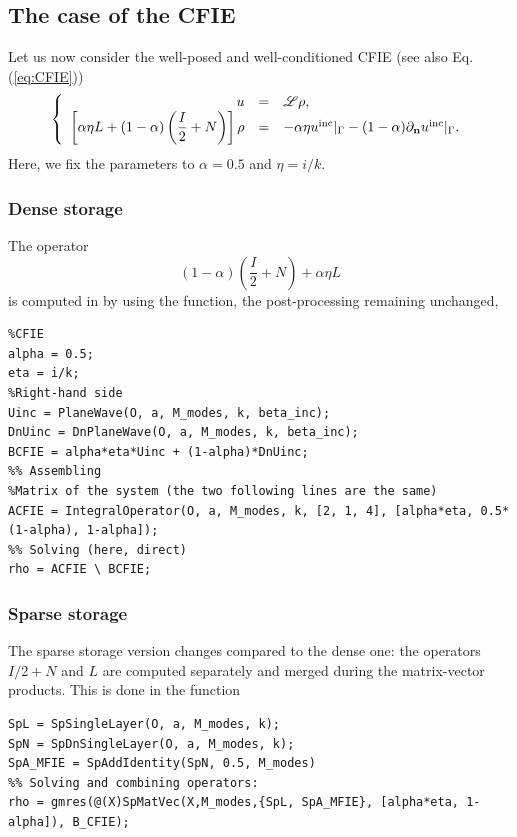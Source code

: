 \subsection{The case of the CFIE}

Let us now consider  the well-posed and well-conditioned CFIE (see also Eq. (\ref{eq:CFIE}))
$$
\left\{\begin{array}{r c l}
u &=& {\mathscr L}\rho,\\
\displaystyle \left[\alpha\eta L  + (1-\alpha)\left(\frac{I}{2}+N\right)\right]\rho &=& -\alpha\eta u^{\textrm{inc}}|_{\Gamma} - (1-\alpha) \partial_{\mathbf{n}}u^{\textrm{inc}}|_{\Gamma}.
\end{array}\right.
$$
Here, we fix the parameters  to $\alpha=0.5$ and $\eta = i/k$. 

\subsubsection{Dense storage}

The operator $$(1-\alpha)\left(\frac{I}{2}+N\right) + \alpha\eta L$$ is computed in \mudiff by
using the \IntegralOperator function,  the post-processing remaining  unchanged,
\begin{lstlisting}
%CFIE
alpha = 0.5;
eta = i/k;
%Right-hand side
Uinc = PlaneWave(O, a, M_modes, k, beta_inc);
DnUinc = DnPlaneWave(O, a, M_modes, k, beta_inc);
BCFIE = alpha*eta*Uinc + (1-alpha)*DnUinc;
%% Assembling
%Matrix of the system (the two following lines are the same)
ACFIE = IntegralOperator(O, a, M_modes, k, [2, 1, 4], [alpha*eta, 0.5*(1-alpha), 1-alpha]);
%% Solving (here, direct)
rho = ACFIE \ BCFIE;
\end{lstlisting}
\medskip

\subsubsection{Sparse storage}

The sparse storage version changes compared to the dense one: the operators $I/2 + N$ and $L$ are computed separately and merged during the matrix-vector products. This is done in the \SpMatVec function
\begin{lstlisting}
SpL = SpSingleLayer(O, a, M_modes, k);
SpN = SpDnSingleLayer(O, a, M_modes, k);
SpA_MFIE = SpAddIdentity(SpN, 0.5, M_modes)
%% Solving and combining operators:
rho = gmres(@(X)SpMatVec(X,M_modes,{SpL, SpA_MFIE}, [alpha*eta, 1-alpha]), B_CFIE);
\end{lstlisting}
\medskip

